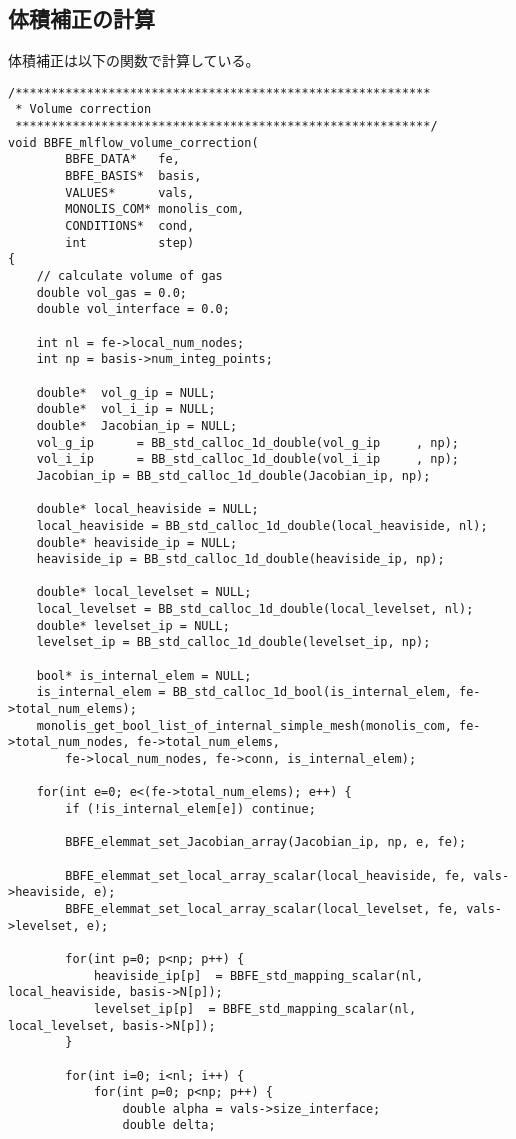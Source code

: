 \subsection{体積補正の計算}
体積補正は以下の関数で計算している。
\begin{lstlisting}[caption = mlflow\_fs\_sups.cにおける体積補正の計算]
/**********************************************************
 * Volume correction
 **********************************************************/
void BBFE_mlflow_volume_correction(
		BBFE_DATA*   fe,
		BBFE_BASIS*  basis,
		VALUES*      vals,
		MONOLIS_COM* monolis_com,
		CONDITIONS*  cond,
		int          step)
{
	// calculate volume of gas
	double vol_gas = 0.0;
	double vol_interface = 0.0;

	int nl = fe->local_num_nodes;
	int np = basis->num_integ_points;

	double*  vol_g_ip = NULL;
	double*  vol_i_ip = NULL;
	double*  Jacobian_ip = NULL;
	vol_g_ip      = BB_std_calloc_1d_double(vol_g_ip     , np);
	vol_i_ip      = BB_std_calloc_1d_double(vol_i_ip     , np);
	Jacobian_ip = BB_std_calloc_1d_double(Jacobian_ip, np);

	double* local_heaviside = NULL;
	local_heaviside = BB_std_calloc_1d_double(local_heaviside, nl);
	double* heaviside_ip = NULL;
	heaviside_ip = BB_std_calloc_1d_double(heaviside_ip, np);

	double* local_levelset = NULL;
	local_levelset = BB_std_calloc_1d_double(local_levelset, nl);
	double* levelset_ip = NULL;
	levelset_ip = BB_std_calloc_1d_double(levelset_ip, np);

	bool* is_internal_elem = NULL;
	is_internal_elem = BB_std_calloc_1d_bool(is_internal_elem, fe->total_num_elems);
	monolis_get_bool_list_of_internal_simple_mesh(monolis_com, fe->total_num_nodes, fe->total_num_elems,
		fe->local_num_nodes, fe->conn, is_internal_elem);

	for(int e=0; e<(fe->total_num_elems); e++) {
		if (!is_internal_elem[e]) continue;

		BBFE_elemmat_set_Jacobian_array(Jacobian_ip, np, e, fe);

		BBFE_elemmat_set_local_array_scalar(local_heaviside, fe, vals->heaviside, e);
		BBFE_elemmat_set_local_array_scalar(local_levelset, fe, vals->levelset, e);

		for(int p=0; p<np; p++) {	
			heaviside_ip[p]  = BBFE_std_mapping_scalar(nl, local_heaviside, basis->N[p]);
			levelset_ip[p]  = BBFE_std_mapping_scalar(nl, local_levelset, basis->N[p]);
		}

		for(int i=0; i<nl; i++) {
			for(int p=0; p<np; p++) {
				double alpha = vals->size_interface;
				double delta;


\end{lstlisting}
